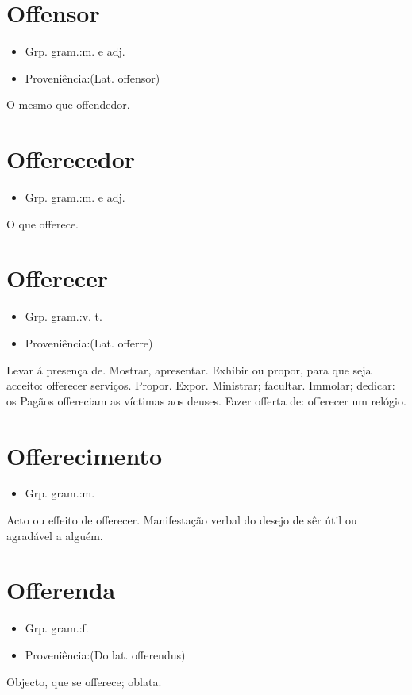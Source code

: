 \section{Offensor}
\begin{itemize}
\item {Grp. gram.:m.  e  adj.}
\end{itemize}
\begin{itemize}
\item {Proveniência:(Lat. \textunderscore offensor\textunderscore )}
\end{itemize}
O mesmo que \textunderscore offendedor\textunderscore .
\section{Offerecedor}
\begin{itemize}
\item {Grp. gram.:m.  e  adj.}
\end{itemize}
O que offerece.
\section{Offerecer}
\begin{itemize}
\item {Grp. gram.:v. t.}
\end{itemize}
\begin{itemize}
\item {Proveniência:(Lat. \textunderscore offerre\textunderscore )}
\end{itemize}
Levar á presença de.
Mostrar, apresentar.
Exhibir ou propor, para que seja acceito: \textunderscore offerecer serviços\textunderscore .
Propor.
Expor.
Ministrar; facultar.
Immolar; dedicar: \textunderscore os Pagãos offereciam as víctimas aos deuses\textunderscore .
Fazer offerta de: \textunderscore offerecer um relógio\textunderscore .
\section{Offerecimento}
\begin{itemize}
\item {Grp. gram.:m.}
\end{itemize}
Acto ou effeito de offerecer.
Manifestação verbal do desejo de sêr útil ou agradável a alguém.
\section{Offerenda}
\begin{itemize}
\item {Grp. gram.:f.}
\end{itemize}
\begin{itemize}
\item {Proveniência:(Do lat. \textunderscore offerendus\textunderscore )}
\end{itemize}
Objecto, que se offerece; oblata.
